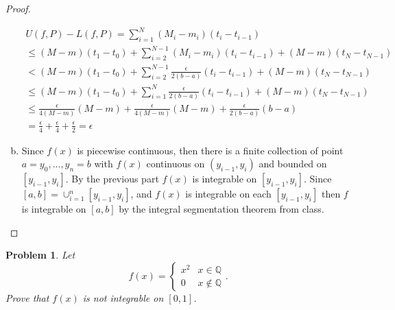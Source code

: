 \documentclass[11pt]{article}
\theoremstyle{plain}
\newtheorem{problem}{Problem}
\theoremstyle{remark}
\newcommand {\mbQ} {\mathbb Q}
\newcommand {\pwi}[4] {\begin{cases} 
		#1 & #2 \\
		#3 & #4
\end{cases}}
\begin{document}
\begin{proof}
\begin{enumerate}[a.]
		\begin{equation*}
		\begin{gathered}
		U(f,P)-L(f,P)=\sum_{i=1}^N (M_i-m_i)(t_i-t_{i-1})\\\leq (M-m)(t_1-t_0)+\sum_{i=2}^{N-1} (M_i-m_i)(t_i-t_{i-1})+(M-m)(t_{N}-t_{N-1})\\
		<(M-m)(t_1-t_0)+\sum_{i=2}^{N-1} \frac{\epsilon}{2(b-a)}(t_i-t_{i-1})+(M-m)(t_{N}-t_{N-1})\\
		\leq (M-m)(t_1-t_0)+\sum_{i=1}^N \frac{\epsilon}{2(b-a)}(t_i-t_{i-1})+(M-m)(t_{N}-t_{N-1})\\
		\leq \frac{\epsilon}{4(M-m)}(M-m)+\frac{\epsilon}{4(M-m)}(M-m)+\frac{\epsilon}{2(b-a)}(b-a)\\=\frac \epsilon 4 + \frac \epsilon 4 + \frac \epsilon 2 =\epsilon
		\end{gathered}
		\end{equation*}
		\item Since $f(x)$ is piecewise continuous, then there is a finite collection of point $a=y_0,...,y_n=b$ with $f(x)$ continuous on $(y_{i-1},y_i)$ and bounded on $[y_{i-1},y_i]$. By the previous part $f(x)$ is integrable on $[y_{i-1},y_i]$. Since $[a,b]=\cup_{i=1}^n [y_{i-1},y_i]$, and $f(x)$ is integrable on each $[y_{i-1},y_i]$ then $f$ is integrable on $[a,b]$ by the integral segmentation theorem from class.
	\end{enumerate}
\end{proof}

\begin{problem}
	Let \[f(x) = \pwi{x^2}{x\in \mbQ}{0}{x\notin \mbQ}.\] Prove that $f(x)$ is not integrable on $[0,1]$.
\end{problem}
\end{document}
